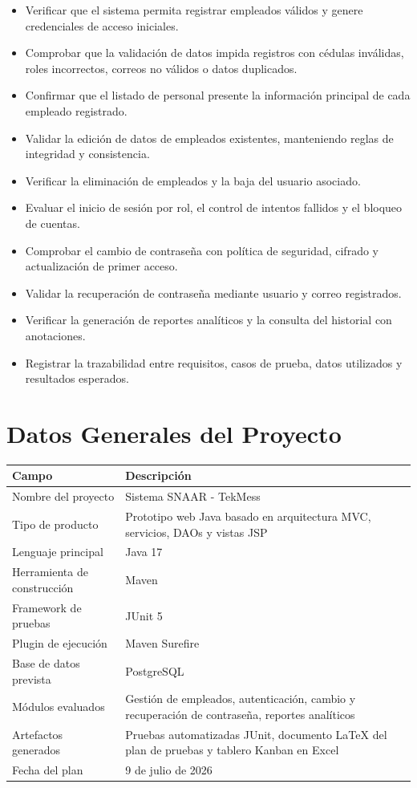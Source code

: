 \documentclass[12pt,a4paper]{article}
\begin{document}
\begin{itemize}[leftmargin=*]
    \item Verificar que el sistema permita registrar empleados válidos y genere credenciales de acceso iniciales.
    \item Comprobar que la validación de datos impida registros con cédulas inválidas, roles incorrectos, correos no válidos o datos duplicados.
    \item Confirmar que el listado de personal presente la información principal de cada empleado registrado.
    \item Validar la edición de datos de empleados existentes, manteniendo reglas de integridad y consistencia.
    \item Verificar la eliminación de empleados y la baja del usuario asociado.
    \item Evaluar el inicio de sesión por rol, el control de intentos fallidos y el bloqueo de cuentas.
    \item Comprobar el cambio de contraseña con política de seguridad, cifrado y actualización de primer acceso.
    \item Validar la recuperación de contraseña mediante usuario y correo registrados.
    \item Verificar la generación de reportes analíticos y la consulta del historial con anotaciones.
    \item Registrar la trazabilidad entre requisitos, casos de prueba, datos utilizados y resultados esperados.
\end{itemize}

\section{Datos Generales del Proyecto}

\begin{longtable}{|p{5cm}|p{9cm}|}
\hline
\rowcolor{grisClaro}
\textbf{Campo} & \textbf{Descripción} \\
\hline
Nombre del proyecto & Sistema SNAAR - TekMess \\
\hline
Tipo de producto & Prototipo web Java basado en arquitectura MVC, servicios, DAOs y vistas JSP \\
\hline
Lenguaje principal & Java 17 \\
\hline
Herramienta de construcción & Maven \\
\hline
Framework de pruebas & JUnit 5 \\
\hline
Plugin de ejecución & Maven Surefire \\
\hline
Base de datos prevista & PostgreSQL \\
\hline
Módulos evaluados & Gestión de empleados, autenticación, cambio y recuperación de contraseña, reportes analíticos \\
\hline
Artefactos generados & Pruebas automatizadas JUnit, documento LaTeX del plan de pruebas y tablero Kanban en Excel \\
\hline
Fecha del plan & 9 de julio de 2026 \\
\hline
\end{longtable}
\end{document}
